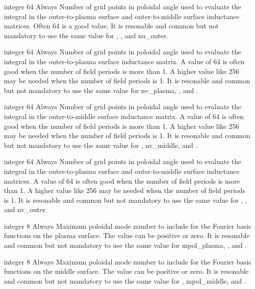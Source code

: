 {integer}
{64}
{Always}
{Number of grid points in poloidal angle used to evaluate the integral  in the outer-to-plasma surface and outer-to-middle surface inductance matrices.
Often 64 is a good value.
It is resonable and common but not mandatory to use the same value for , , and nu\_outer.}

\myhrule

{integer}
{64}
{Always}
{Number of grid points in poloidal angle used to evaluate the integral  in the outer-to-plasma surface inductance matrix.
A value of 64 is often good when the number of field periods is more than 1. A higher value like 256 may be needed when the number of field periods is 1.
It is resonable and common but not mandatory to use the same value for nv\_plasma, , and .}

\myhrule

{integer}
{64}
{Always}
{Number of grid points in poloidal angle used to evaluate the integral  in the outer-to-middle surface inductance matrix.
A value of 64 is often good when the number of field periods is more than 1. A higher value like 256 may be needed when the number of field periods is 1.
It is resonable and common but not mandatory to use the same value for , nv\_middle, and .}

\myhrule

{integer}
{64}
{Always}
{Number of grid points in poloidal angle used to evaluate the integral  in the outer-to-plasma surface and outer-to-middle surface inductance matrices.
A value of 64 is often good when the number of field periods is more than 1. A higher value like 256 may be needed when the number of field periods is 1.
It is resonable and common but not mandatory to use the same value for , , and nv\_outer.}

\myhrule

{integer}
{8}
{Always}
{Maximum poloidal mode number to include for the Fourier basis functions on the plasma surface. The value can be positive or zero.
It is resonable and common but not mandatory to use the same value for {\ttfamily mpol\_plasma}, , and .}

\myhrule

{integer}
{8}
{Always}
{Maximum poloidal mode number to include for the Fourier basis functions on the middle surface. The value can be positive or zero.
It is resonable and common but not mandatory to use the same value for , {\ttfamily mpol\_middle}, and .}


